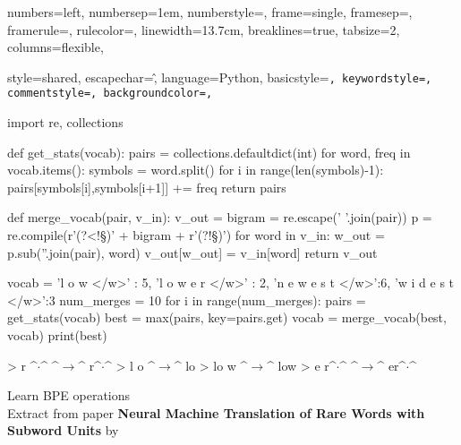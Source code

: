 {
    numbers=left,
    numbersep=1em,
    numberstyle=\tiny\color{red},
    frame=single,
    framesep=\fboxsep,
    framerule=\fboxrule,
    rulecolor=\color{red!20},
    linewidth=13.7cm,
    breaklines=true,
    tabsize=2,
    columns=flexible,
}

{
    style=shared,
    escapechar=\^,
    language={Python},
    basicstyle=\small\tt,
    keywordstyle=\color{blue},
    commentstyle=\color[rgb]{0.13,0.54,0.13},
    backgroundcolor=\color{cyan!5},
}

{\lstset{style=python}}
{}

\begin{algorithm}[!h]
\begin{python}
import re, collections

def get_stats(vocab):
    pairs = collections.defaultdict(int)
    for word, freq in vocab.items():
    symbols = word.split()
    for i in range(len(symbols)-1):
        pairs[symbols[i],symbols[i+1]] += freq
    return pairs

def merge_vocab(pair, v_in):
    v_out = {}
    bigram = re.escape(' '.join(pair))
    p = re.compile(r'(?<!\S)' + bigram + r'(?!\S)')
    for word in v_in:
    w_out = p.sub(''.join(pair), word)
    v_out[w_out] = v_in[word]
    return v_out

vocab = {'l o w </w>' : 5, 'l o w e r </w>' : 2,
            'n e w e s t </w>':6, 'w i d e s t </w>':3}
num_merges = 10
for i in range(num_merges):
    pairs = get_stats(vocab)
    best = max(pairs, key=pairs.get)
    vocab = merge_vocab(best, vocab)
    print(best)

> r ^$\cdot$^ ^$\rightarrow$^ r^$\cdot$^
> l o ^$\rightarrow$^ lo
> lo w ^$\rightarrow$^ low
> e r^$\cdot$^ ^$\rightarrow$^ er^$\cdot$^
\end{python}
\caption{Learn BPE operations \\ Extract from paper \textbf{Neural Machine Translation of Rare Words with Subword Units} by \citep{sennrich2016}}
\label{bpe-algorithm}
\end{algorithm}
